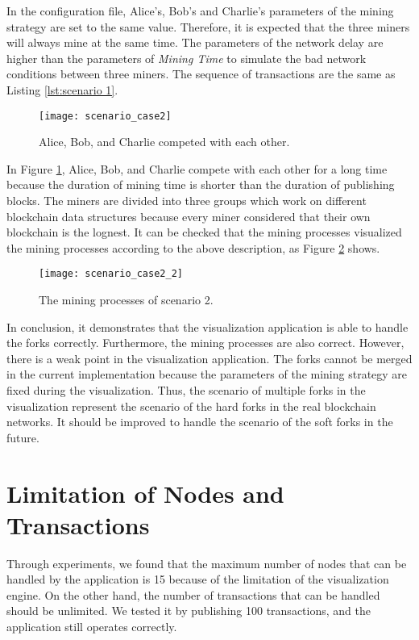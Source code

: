 In the configuration file, Alice's, Bob's and Charlie's parameters of the mining strategy are set to the same value. Therefore, it is expected that the three miners will always mine at the same time. The parameters of the network delay are higher than the parameters of \textit{Mining Time} to simulate the bad network conditions between three miners. The sequence of transactions are the same as Listing \ref{lst:scenario 1}.

\begin{figure}[htb]
    \centering
    \texttt{[image: scenario\_case2]}
    \caption{Alice, Bob, and Charlie competed with each other.}
    \label{fig:alice, bob, and charlie competed with each other}
\end{figure}

In Figure \ref{fig:alice, bob, and charlie competed with each other}, Alice, Bob, and Charlie compete with each other for a long time because the duration of mining time is shorter than the duration of publishing blocks. The miners are divided into three groups which work on different blockchain data structures because every miner considered that their own blockchain is the lognest. It can be checked that the mining processes visualized the mining processes according to the above description, as Figure \ref{fig:the mining processes of scenario 2} shows.

\begin{figure}[htb]
    \centering
    \texttt{[image: scenario\_case2\_2]}
    \caption{The mining processes of scenario 2.}
    \label{fig:the mining processes of scenario 2}
\end{figure}

In conclusion, it demonstrates that the visualization application is able to handle the forks correctly. Furthermore, the mining processes are also correct. However, there is a weak point in the visualization application. The forks cannot be merged in the current implementation because the parameters of the mining strategy are fixed during the visualization. Thus, the scenario of multiple forks in the visualization represent the scenario of the hard forks in the real blockchain networks. It should be improved to handle the scenario of the soft forks in the future.

\section{Limitation of Nodes and Transactions}

Through experiments, we found that the maximum number of nodes that can be handled by the application is 15 because of the limitation of the visualization engine. On the other hand, the number of transactions that can be handled should be unlimited. We tested it by publishing 100 transactions, and the application still operates correctly.

